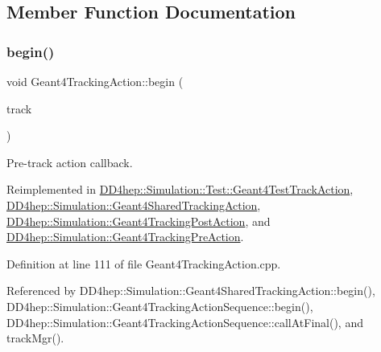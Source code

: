 \subsection{Member Function Documentation}
\hypertarget{class_d_d4hep_1_1_simulation_1_1_geant4_tracking_action_a65858867a7b71bf4f48b9f140bc9a88d}{}\label{class_d_d4hep_1_1_simulation_1_1_geant4_tracking_action_a65858867a7b71bf4f48b9f140bc9a88d} 
\subsubsection{\texorpdfstring{begin()}{begin()}}
{\footnotesize\ttfamily void Geant4\+Tracking\+Action\+::begin (\begin{DoxyParamCaption}\item[{const G4\+Track $\ast$}]{track }\end{DoxyParamCaption})\hspace{0.3cm}{\ttfamily [virtual]}}



Pre-\/track action callback. 



Reimplemented in \hyperlink{class_d_d4hep_1_1_simulation_1_1_test_1_1_geant4_test_track_action_a461ee9be4bf51bcfac397d093fb55fb8}{D\+D4hep\+::\+Simulation\+::\+Test\+::\+Geant4\+Test\+Track\+Action}, \hyperlink{class_d_d4hep_1_1_simulation_1_1_geant4_shared_tracking_action_a67db960b642ca48cc171c0d1296e4125}{D\+D4hep\+::\+Simulation\+::\+Geant4\+Shared\+Tracking\+Action}, \hyperlink{class_d_d4hep_1_1_simulation_1_1_geant4_tracking_post_action_a3460d57b0bf474e1b83a3302056cf716}{D\+D4hep\+::\+Simulation\+::\+Geant4\+Tracking\+Post\+Action}, and \hyperlink{class_d_d4hep_1_1_simulation_1_1_geant4_tracking_pre_action_a1a4535994e5225ef10c47164a21deb92}{D\+D4hep\+::\+Simulation\+::\+Geant4\+Tracking\+Pre\+Action}.



Definition at line 111 of file Geant4\+Tracking\+Action.\+cpp.



Referenced by D\+D4hep\+::\+Simulation\+::\+Geant4\+Shared\+Tracking\+Action\+::begin(), D\+D4hep\+::\+Simulation\+::\+Geant4\+Tracking\+Action\+Sequence\+::begin(), D\+D4hep\+::\+Simulation\+::\+Geant4\+Tracking\+Action\+Sequence\+::call\+At\+Final(), and track\+Mgr().

